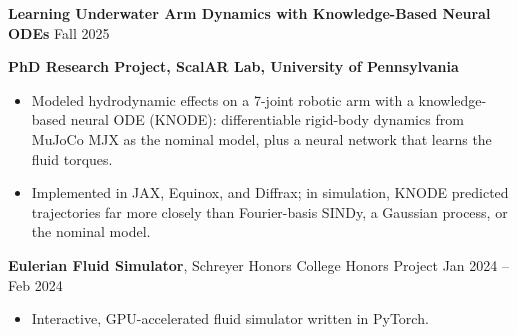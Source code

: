 \vspace{12pt}

\textbf{Learning Underwater Arm Dynamics with Knowledge-Based Neural ODEs} \hfill Fall 2025

\textbf{PhD Research Project, ScalAR Lab, University of Pennsylvania}\\
\begin{itemize}[noitemsep, topsep=0pt, partopsep=0pt, parsep=0pt]
    \item Modeled hydrodynamic effects on a 7-joint robotic arm with a knowledge-based neural ODE (KNODE): differentiable rigid-body dynamics from MuJoCo MJX as the nominal model, plus a neural network that learns the fluid torques.

    \item Implemented in JAX, Equinox, and Diffrax; in simulation, KNODE predicted trajectories far more closely than Fourier-basis SINDy, a Gaussian process, or the nominal model.
\end{itemize}

\vspace{12pt}

\textbf{Eulerian Fluid Simulator}, Schreyer Honors College Honors Project \hfill Jan 2024 -- Feb 2024
\begin{itemize}[noitemsep, topsep=0pt, partopsep=0pt, parsep=0pt]
    \item Interactive, GPU-accelerated fluid simulator written in PyTorch.
\end{itemize}

